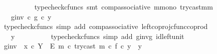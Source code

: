 \begin{isabellebody}
\ \ \ \ \ \ \ \ \isamarkupfalse%
\ {\isacharparenleft}{\kern0pt}typecheck{\isacharunderscore}{\kern0pt}cfuncs{\isacharcomma}{\kern0pt}\ smt\ comp{\isacharunderscore}{\kern0pt}associative{}\ m{\isacharunderscore}{\kern0pt}mono\ try{\isacharunderscore}{\kern0pt}cast{\isacharunderscore}{\kern0pt}m{\isacharunderscore}{\kern0pt}m{\isacharparenright}{\kern0pt}\isanewline
\ \ \ \ \ \ \isamarkupfalse%
\ \isamarkupfalse%
\ {\isachardoublequoteopen}{\isachardot}{\kern0pt}{\isachardot}{\kern0pt}{\isachardot}{\kern0pt}\ {\isacharequal}{\kern0pt}\ {\isacharparenleft}{\kern0pt}g{\isacharunderscore}{\kern0pt}inv\ {\isasymcirc}\isactrlsub c\ g{\isacharparenright}{\kern0pt}\ {\isasymcirc}\isactrlsub c\ y{\isachardoublequoteclose}\isanewline
\ \ \ \ \ \ \ \ \isamarkupfalse%
\ {\isacharparenleft}{\kern0pt}typecheck{\isacharunderscore}{\kern0pt}cfuncs{\isacharcomma}{\kern0pt}\ simp\ add{\isacharcolon}{\kern0pt}\ comp{\isacharunderscore}{\kern0pt}associative{}\ left{\isacharunderscore}{\kern0pt}coproj{\isacharunderscore}{\kern0pt}cfunc{\isacharunderscore}{\kern0pt}coprod{\isacharparenright}{\kern0pt}\isanewline
\ \ \ \ \ \ \isamarkupfalse%
\ \isamarkupfalse%
\ {\isachardoublequoteopen}{\isachardot}{\kern0pt}{\isachardot}{\kern0pt}{\isachardot}{\kern0pt}\ {\isacharequal}{\kern0pt}\ y{\isachardoublequoteclose}\isanewline
\ \ \ \ \ \ \ \ \isamarkupfalse%
\ {\isacharparenleft}{\kern0pt}typecheck{\isacharunderscore}{\kern0pt}cfuncs{\isacharcomma}{\kern0pt}\ simp\ add{\isacharcolon}{\kern0pt}\ g{\isacharunderscore}{\kern0pt}inv{\isacharunderscore}{\kern0pt}g\ id{\isacharunderscore}{\kern0pt}left{\isacharunderscore}{\kern0pt}unit{}{\isacharparenright}{\kern0pt}\isanewline
\ \ \ \ \ \ \isamarkupfalse%
\ \isamarkupfalse%
\ {\isachardoublequoteopen}{\isacharparenleft}{\kern0pt}g{\isacharunderscore}{\kern0pt}inv\ {\isasymamalg}\ {\isacharparenleft}{\kern0pt}x\ {\isasymcirc}\isactrlsub c\ {\isasymbeta}\isactrlbsub Y\ {\isasymsetminus}\ {\isacharparenleft}{\kern0pt}E{\isacharcomma}{\kern0pt}\ m{\isacharparenright}{\kern0pt}\isactrlesub {\isacharparenright}{\kern0pt}\ {\isasymcirc}\isactrlsub c\ try{\isacharunderscore}{\kern0pt}cast\ m{\isacharparenright}{\kern0pt}\ {\isasymcirc}\isactrlsub c\ f\ {\isasymcirc}\isactrlsub c\ y\ {\isacharequal}{\kern0pt}\ y{\isachardoublequoteclose}\isacommand{{\isachardot}{\kern0pt}}\isamarkupfalse%
\isanewline
\ \ \ \ \isamarkupfalse%
\isanewline
\ \ \ \ \isamarkupfalse%

\end{isabellebody}
